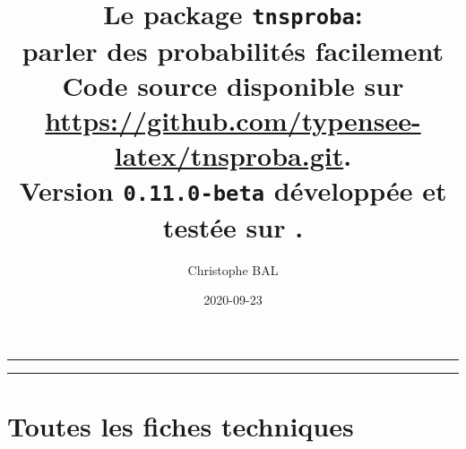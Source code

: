 \documentclass[12pt,a4paper]{article}
\begin{document}
\renewcommand\labelitemi{\raisebox{0.125em}{\tiny\textbullet}}
\renewcommand{\labelitemii}{---}

\title{  %
	Le package \texttt{tnsproba}:\\%
	parler des probabilités facilement\\%
	{\footnotesize Code source disponible sur \url{https://github.com/typensee-latex/tnsproba.git}.}\\%
{\footnotesize Version \texttt{0.11.0-beta} développée et testée sur \macosxname{}.}%
}
\author{Christophe BAL}
\date{2020-09-23}

\maketitle


\vspace{2em}

\hrule

\tableofcontents

\vspace{1.5em}

\hrule

\newpage



\newpage
\section{Toutes les fiches techniques} \label{techincal-ids}

\end{document}

